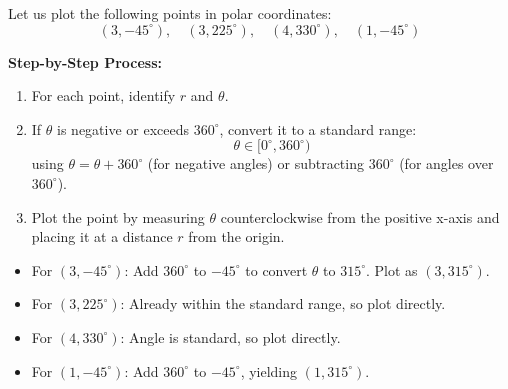 \documentclass{article}
\begin{document}
\begin{examplebox}
Let us plot the following points in polar coordinates:
\[
(3, -45^\circ), \quad (3, 225^\circ), \quad (4, 330^\circ), \quad (1, -45^\circ)
\]

\begin{algorithmbox}
    \textbf{Step-by-Step Process:}
    \begin{enumerate}
        \item For each point, identify \( r \) and \( \theta \).
        \item If \( \theta \) is negative or exceeds \( 360^\circ \), convert it to a standard range:
        \[
        \theta \in [0^\circ, 360^\circ)
        \]
        using \( \theta = \theta + 360^\circ \) (for negative angles) or subtracting \( 360^\circ \) (for angles over \( 360^\circ \)).
        \item Plot the point by measuring \( \theta \) counterclockwise from the positive x-axis and placing it at a distance \( r \) from the origin.
    \end{enumerate}
\end{algorithmbox}

\begin{solutionbox}
    \begin{itemize}
        \item For \( (3, -45^\circ) \): Add \( 360^\circ \) to \(-45^\circ\) to convert \( \theta \) to \( 315^\circ \). Plot as \( (3, 315^\circ) \).
        \item For \( (3, 225^\circ) \): Already within the standard range, so plot directly.
        \item For \( (4, 330^\circ) \): Angle is standard, so plot directly.
        \item For \( (1, -45^\circ) \): Add \( 360^\circ \) to \(-45^\circ\), yielding \( (1, 315^\circ) \).
    \end{itemize}
    

\end{solutionbox}
\end{examplebox}
\end{document}
